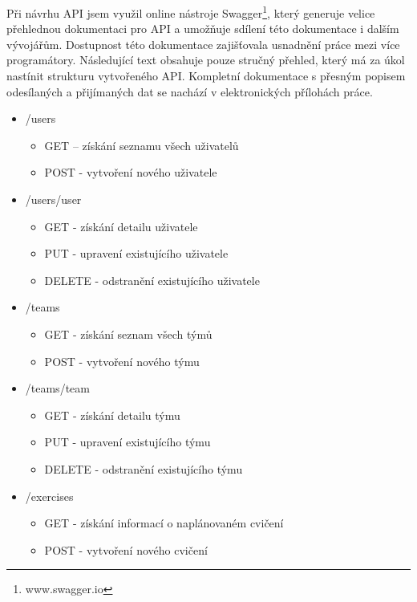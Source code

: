 \documentclass[
  digital, %
  twoside, %
  table,   %
  lof,     %
  lot,     %
]{fithesis3}
\begin{document}
Při návrhu API jsem využil online nástroje Swagger\footnote{www.swagger.io}, který generuje velice přehlednou dokumentaci pro API a umožňuje sdílení této dokumentace i dalším vývojářům. Dostupnost této dokumentace zajišťovala usnadnění práce mezi více programátory. Následující text obsahuje pouze stručný přehled, který má za úkol nastínit strukturu vytvořeného API. Kompletní dokumentace s přesným popisem odesílaných a přijímaných dat se nachází v elektronických přílohách práce.

\renewcommand\labelitemii{$\square$}
\begin{itemize}
    \item /users
    \begin{itemize}
        \item GET -- získání seznamu všech uživatelů
        \item POST -  vytvoření nového uživatele
    \end{itemize}
    
    \item /users/{user}
    \begin{itemize}
        \item GET - získání detailu uživatele
        \item PUT - upravení existujícího uživatele
        \item DELETE - odstranění existujícího uživatele
    \end{itemize}
    
    \item /teams
    \begin{itemize}
        \item GET - získání seznam všech týmů
        \item POST -  vytvoření nového týmu
    \end{itemize}
    
    \item /teams/{team}
    \begin{itemize}
        \item GET - získání detailu týmu
        \item PUT - upravení existujícího týmu
        \item DELETE - odstranění existujícího týmu
    \end{itemize}
    
    \item /exercises
    \begin{itemize}
        \item GET - získání informací o naplánovaném cvičení
        \item POST - vytvoření nového cvičení
    \end{itemize}
    

\end{itemize}
\end{document}
